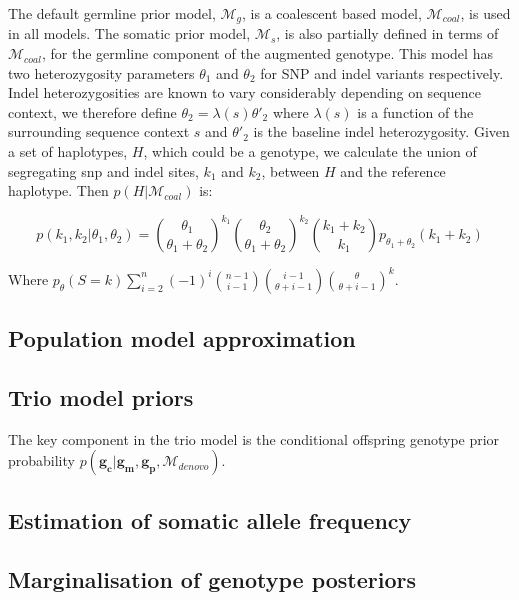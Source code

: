 \documentclass[notitlepage, twocolumn]{article}
\begin{document}
The default germline prior model, $\mathcal{M}_{g}$, is a coalescent based model, $\mathcal{M}_{coal}$, is used in all models. The somatic prior model, $\mathcal{M}_s$, is also partially defined in terms of $\mathcal{M}_{coal}$, for the germline component of the augmented genotype. This model has two heterozygosity parameters $\theta_{1}$ and $\theta_{2}$ for SNP and indel variants respectively. Indel heterozygosities are known to vary considerably depending on sequence context, we therefore define $\theta_{2} = \lambda(s) \theta'_{2}$ where $\lambda(s)$ is a function of the surrounding sequence context $s$ and $\theta'_{2}$ is the baseline indel heterozygosity. Given a set of haplotypes, $H$, which could be a genotype, we calculate the union of segregating snp and indel sites, $k_{1}$ and $k_{2}$, between $H$ and the reference haplotype. Then $p(H | \mathcal{M}_{coal})$ is:

\begin{equation*}
    p(k_{1}, k_{2} |  \theta_{1}, \theta_{2}) = \binom{\theta_{1}}{\theta_{1} + \theta_{2}}^{k_1} \binom{\theta_{2}}{\theta_{1} + \theta_{2}}^{k_{2}} \binom{k_{1} + k_{2}}{k_{1}} p_{\theta_{1} + \theta_{2}} (k_{1} + k_{2})
\end{equation*}

Where $p_\theta(S = k)\sum_{i=2}^n (-1)^i \binom{n - 1}{i - 1} \binom{i - 1}{\theta + i - 1} \binom{\theta}{\theta + i - 1}^k$.

\subsection*{Population model approximation}

\subsection*{Trio model priors}

The key component in the trio model is the conditional offspring genotype prior probability $p(\boldsymbol{g_c} | \boldsymbol{g_m}, \boldsymbol{g_p}, \mathcal{M}_{denovo})$. 

\subsection*{Estimation of somatic allele frequency}

\subsection*{Marginalisation of genotype posteriors}
\end{document}
